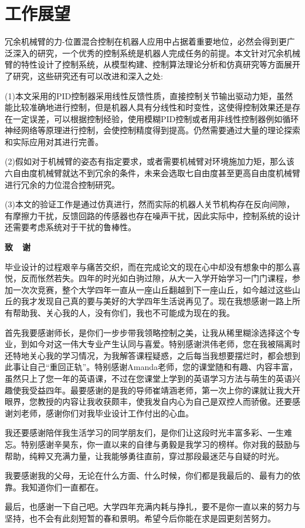 \documentclass[12pt,a4paper,openany,oneside]{book}%
\numberwithin{equation}{chapter}%
\numberwithin{figure}{chapter}%
\begin{document}
\section{工作展望}
冗余机械臂的力-位置混合控制在机器人应用中占据着重要地位，必然会得到更广泛深入的研究，一个优秀的控制系统是机器人完成任务的前提。本文针对冗余机械臂的特性设计了控制系统，从模型构建、控制算法理论分析和仿真研究等方面展开了研究，这些研究还有可以改进和深入之处:\par
(1)本文采用的PID控制器采用线性反馈性质，直接控制关节输出驱动力矩，虽然能比较准确地进行控制，但是机器人具有分线性和时变性，这使得控制效果还是存在一定误差，可以根据控制经验，使用模糊PID控制或者用非线性控制器例如循环神经网络等原理进行控制，会使控制精度得到提高。仍然需要通过大量的理论探索和实际应用对其进行完善。\par
(2)假如对于机械臂的姿态有指定要求，或者需要机械臂对环境施加力矩，那么该六自由度机械臂就达不到冗余的条件，未来会选取七自由度甚至更高自由度机械臂进行冗余的力位混合控制研究。\par
(3)本文的验证工作是通过仿真进行，然而实际的机器人关节机构存在反向间隙，有摩擦力干扰，反馈回路的传感器也存在噪声干扰，因此实际中，控制系统的设计还需要考虑系统对于干扰的鲁棒性。
	\newpage
	\begin{center}
		\textbf{\fontsize{16}{18}\selectfont 致\ \ 谢}
	\end{center}

	毕业设计的过程艰辛与痛苦交织，而在完成论文的现在心中却没有想象中的那么喜悦，反而怅然若失。四年的时光如白驹过隙，从大一入学开始学习一门门课程，参加一次次竞赛，整个大学四年一直从一座山丘翻越到下一座山丘，如今越过这些山丘的我才发现自己真的要与美好的大学四年生活说再见了。现在我想感谢一路上所有帮助我、关心我的人，没有你们，我也不可能成为现在的我。\par
    首先我要感谢师长，是你们一步步带我领略控制之美，让我从稀里糊涂选择这个专业，到如今对这一伟大专业产生认同与喜爱。特别感谢洪伟老师，您在我被隔离时还特地关心我的学习情况，为我解答课程疑惑，之后每当我想要摆烂时，都会想到此事让自己“重回正轨”。特别感谢Amanda老师，您的课堂随和有趣、内容丰富，虽然只上了您一年的英语课，不过在您课堂上学到的英语学习方法与萌生的英语兴趣使我受益四年。最要感谢的是我的导师崔靖涵老师，第一次上你的课就让我大开眼界，您教授的内容让我收获颇丰，使我发自内心为自己是双控人而骄傲。还要感谢刘老师，感谢你们对我毕业设计工作付出的心血。\par
    我还要感谢陪伴我生活学习的同学朋友们，是你们让这段时光丰富多彩、一生难忘。特别感谢辛昊东，你一直以来的自律与勇毅是我学习的榜样。你对我的鼓励与帮助，纯粹又充满力量，让我能够勇往直前，穿过那段最迷茫与自疑的时光。\par
    我要感谢我的父母，无论在什么方面、什么时候，你们都是我最后的、最有力的依靠。我知道你们一直都在。\par
    最后，也感谢一下自己吧。大学四年充满内耗与挣扎，要不是你一直以来的努力与坚持，也不会有此刻短暂的春和景明。希望今后你能在求是园更刻苦努力。\par
	
	




	\newpage
	
	
	

	
\end{document}

